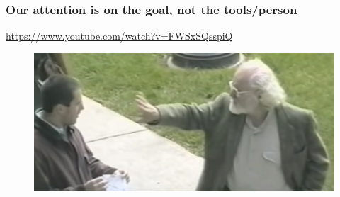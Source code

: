 \documentclass{beamer}
\begin{document}
\begin{frame}
\frametitle{Our attention is on the goal, not the tools/person}
\centering
\url{https://www.youtube.com/watch?v=FWSxSQsspiQ}
\begin{figure}
\includegraphics[width=0.6\linewidth]{image/doorstudy}
\end{figure}
\end{frame}

%
%

\end{document}
